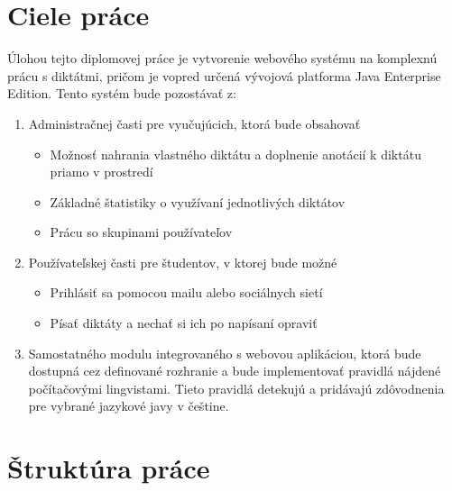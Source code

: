 \documentclass[12pt,oneside]{fithesis2}
\begin{document}
    \section{Ciele práce}
    Úlohou tejto diplomovej práce je vytvorenie webového systému na komplexnú prácu s diktátmi, pričom je vopred určená vývojová platforma Java Enterprise Edition. Tento systém bude pozostávať z:

\begin{enumerate}
\item Administračnej časti pre vyučujúcich, ktorá bude obsahovať
	\begin{itemize}
	\item Možnosť nahrania vlastného diktátu a doplnenie anotácií k diktátu priamo v prostredí
	\item Základné štatistiky o využívaní jednotlivých diktátov
	\item Prácu so skupinami používateľov
	\end{itemize}
\item Používateľskej časti pre študentov, v ktorej bude možné
	\begin{itemize}
	\item Prihlásiť sa pomocou mailu alebo sociálnych sietí
	\item Písať diktáty a nechať si ich po napísaní opraviť
	\end{itemize}
\item Samostatného modulu integrovaného s webovou aplikáciou, ktorá bude dostupná cez definované rozhranie a bude implementovať pravidlá nájdené počítačovými lingvistami. Tieto pravidlá detekujú a pridávajú zdôvodnenia pre vybrané jazykové javy v češtine.
\end{enumerate}
\pagebreak
    \section{Štruktúra práce}
    
\end{document}
